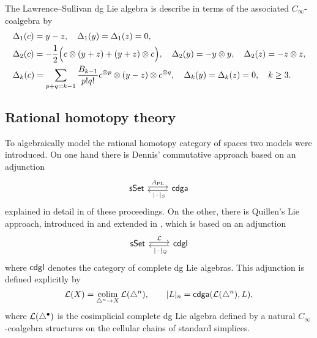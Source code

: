 The Lawrence--Sullivan dg Lie algebra is describe in terms of the associated $C_\infty$-coalgebra by
\begin{align*}
& \Delta_1(c) = y-z, \quad
\Delta_1(y) = \Delta_1(z) = 0, \\
& \Delta_2(c) = -\frac{1}{2} \Big( c \otimes (y+z) + (y+z) \otimes c \Big), \quad
\Delta_2(y) = -y \otimes y, \quad
\Delta_2(z) = -z \otimes z, \\
& \Delta_k(c) = \sum_{p+q=k-1} \frac{B_{k-1}}{p!q!} c^{\otimes p} \otimes (y-z) \otimes c^{\otimes q}, \quad
\Delta_k(y) = \Delta_k(z) = 0, \quad k \geq 3.
\end{align*}

\subsection{Rational homotopy theory} \label{ss:cdgl model}

To algebraically model the rational homotopy category of spaces two models were introduced.
On one hand there is Dennis' commutative approach \cite{sullivan1977infinitesimal} based on an adjunction
\[
\begin{tikzcd}
\sSet \arrow[r, shift left=2pt, "A_{\mathrm{PL}}"] &
\cdga \arrow[l, shift left=2pt, "\ \bars{\,\cdot\,}_S"]
\end{tikzcd}
\]
explained in detail in \cite{bibid} of these proceedings.
On the other, there is Quillen's Lie approach, introduced in \cite{quillen1969rational} and extended in \cite{buijs2013algebraicmodels, buijs2020liemodels}, which is based on an adjunction
\[
\begin{tikzcd}
\sSet \arrow[r, shift left=2pt, "\cL"] &
\cdgl \arrow[l, shift left=2pt, "\ \bars{\,\cdot\,}_Q"]
\end{tikzcd}
\]
where $\mathsf{cdgl}$ denotes the category of complete dg Lie algebras.
This adjunction is defined explicitly by
\[
\mathcal{L}(X) = \operatorname*{colim}_{\triangle^n \to X} \mathcal{L}(\triangle^n), \qquad
\lvert L\rvert_n = \mathsf{cdga}(\mathcal{L}(\triangle^n), L),
\]
where $\mathcal{L}(\triangle^\bullet)$ is the cosimplicial complete dg Lie algebra defined by a natural $C_\infty$-coalgebra structures on the cellular chains of standard simplices.

